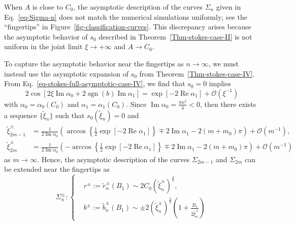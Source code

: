 \documentclass[12pt]{article}
\theoremstyle{plain}
\theoremstyle{definition}
\newtheorem{remark}{\hskip\parindent Remark}
\numberwithin{equation}{section}
\renewcommand\Re{\operatorname{Re}}
\renewcommand\Im{\operatorname{Im}}
\newcommand\sgn{\operatorname{sgn}}
\begin{document}
\begin{remark}
When \( A \) is close to \( C_{0} \), the asymptotic description of the curves \( \Sigma_{n} \) given in Eq.~\eqref{eq-Sigma-n} does not match the numerical simulations uniformly; see the ``fingertips'' in Figure~\ref{fig-classification-curves}. This discrepancy arises because the asymptotic behavior of \( s_{0} \) described in Theorem~\ref{Thm-stokes-case-II} is not uniform in the joint limit \( \xi \to +\infty \) and \( A \to C_{0} \).

To capture the asymptotic behavior near the fingertips as \( n \to \infty \), we must instead use the asymptotic expansion of \( s_{0} \) from Theorem~\ref{Thm-stokes-case-IV}. From Eq.~\eqref{eq-stokes-full-asymptotic-case-IV}, we find that \( s_{0} = 0 \) implies
\begin{equation}
2\cos\left[2\xi\Im\alpha_{0}+2\sgn(b)\Im\alpha_{1}\right]=\exp\left[-2\Re\alpha_{1}\right]+\mathcal{O}(\xi^{-1})
\end{equation}
with $\alpha_{0}=\alpha_{0}(C_{0})$ and $\alpha_{1}=\alpha_{1}(C_{0})$.
Since $\Im\alpha_{0}=\frac{\pi\kappa^2}{4}<0$, then there exists a sequence $\{\widetilde{\xi}_{n}\}$ such that  $s_{0}(\widetilde{\xi}_{n})=0$ and
\begin{equation}\label{eq-approx-tilde-xi-n}
\begin{split}
\widetilde{\xi}_{2m-1}^{\pm}&=\frac{1}{2\Im\alpha_{0}}\left(\arccos\left\{\frac{1}{2}\exp[-2\Re\alpha_{1}]\right\}\mp 2\Im\alpha_{1}-2(m+m_{0})\pi\right)+\mathcal{O}(m^{-1}),\\
\widetilde{\xi}_{2m}^{\pm}&=\frac{1}{2\Im\alpha_{0}}\left(-\arccos\left\{\frac{1}{2}\exp[-2\Re\alpha_{1}]\right\}\mp 2\Im\alpha_{1}-2(m+m_{0})\pi\right)+\mathcal{O}(m^{-1})
\end{split}
\end{equation}
as $m\to\infty$.
Hence, the asymptotic description of the curves \( \Sigma_{2m-1} \) and \( \Sigma_{2m} \) can be extended near the fingertips as
\begin{equation}\label{eq-Sigma-n-extend}
\Sigma_{n}^{\pm}:
\left\{\begin{aligned}
&r^{\pm}:=\widetilde{r}_{n}^{\pm}(B_{1})\sim 2C_{0}\left(\widetilde{\xi}_{n}^{\pm}\right)^{\frac{4}{5}},\\
&b^{\pm}:=\widetilde{b}_{n}^{\pm}(B_{1})\sim \pm 2\left(\widetilde{\xi}_{n}^{\pm}\right)^{\frac{3}{5}}\left(1+\frac{B_{1}}{2\widetilde{\xi}_{n}^{\pm}}\right)
\end{aligned}\right.
\end{equation}

\end{remark}
\end{document}
